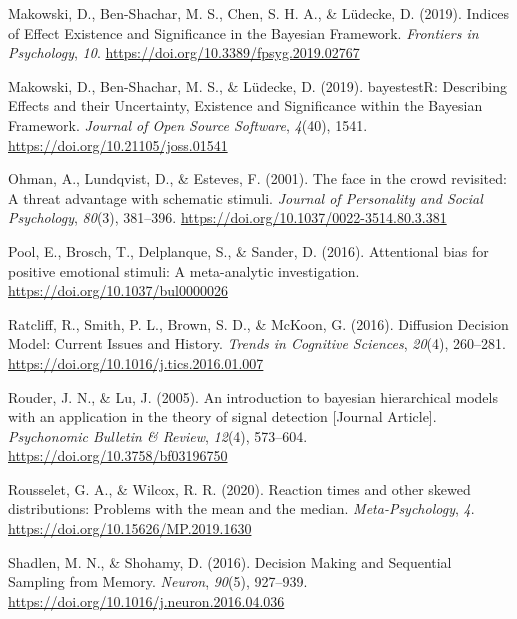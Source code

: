 \documentclass[
  man]{apa6}
\newlength{\cslhangindent}
\newlength{\cslentryspacingunit} %
\newenvironment{CSLReferences}[2] %
 {%
  \setlength{\parindent}{0pt}
  \ifodd #1
  \let\oldpar\par
  \def\par{\hangindent=\cslhangindent\oldpar}
  \fi
  \setlength{\parskip}{#2\cslentryspacingunit}
 }%
 {}
\begin{document}
\begin{CSLReferences}{1}{0}
\leavevmode{}%
Makowski, D., Ben-Shachar, M. S., Chen, S. H. A., \& Lüdecke, D. (2019). Indices of {Effect} {Existence} and {Significance} in the {Bayesian} {Framework}. \emph{Frontiers in Psychology}, \emph{10}. \url{https://doi.org/10.3389/fpsyg.2019.02767}

\leavevmode{}%
Makowski, D., Ben-Shachar, M. S., \& Lüdecke, D. (2019). {bayestestR}: {Describing} {Effects} and their {Uncertainty}, {Existence} and {Significance} within the {Bayesian} {Framework}. \emph{Journal of Open Source Software}, \emph{4}(40), 1541. \url{https://doi.org/10.21105/joss.01541}

\leavevmode{}%
Ohman, A., Lundqvist, D., \& Esteves, F. (2001). The face in the crowd revisited: A threat advantage with schematic stimuli. \emph{Journal of Personality and Social Psychology}, \emph{80}(3), 381--396. \url{https://doi.org/10.1037/0022-3514.80.3.381}

\leavevmode{}%
Pool, E., Brosch, T., Delplanque, S., \& Sander, D. (2016). Attentional bias for positive emotional stimuli: A meta-analytic investigation. \url{https://doi.org/10.1037/bul0000026}

\leavevmode{}%
Ratcliff, R., Smith, P. L., Brown, S. D., \& McKoon, G. (2016). Diffusion {Decision} {Model}: {Current} {Issues} and {History}. \emph{Trends in Cognitive Sciences}, \emph{20}(4), 260--281. \url{https://doi.org/10.1016/j.tics.2016.01.007}

\leavevmode{}%
Rouder, J. N., \& Lu, J. (2005). An introduction to bayesian hierarchical models with an application in the theory of signal detection {[}Journal Article{]}. \emph{Psychonomic Bulletin \& Review}, \emph{12}(4), 573--604. \url{https://doi.org/10.3758/bf03196750}

\leavevmode{}%
Rousselet, G. A., \& Wilcox, R. R. (2020). Reaction times and other skewed distributions: Problems with the mean and the median. \emph{Meta-Psychology}, \emph{4}. \url{https://doi.org/10.15626/MP.2019.1630}

\leavevmode{}%
Shadlen, M. N., \& Shohamy, D. (2016). Decision {Making} and {Sequential} {Sampling} from {Memory}. \emph{Neuron}, \emph{90}(5), 927--939. \url{https://doi.org/10.1016/j.neuron.2016.04.036}


\end{CSLReferences}
\end{document}
